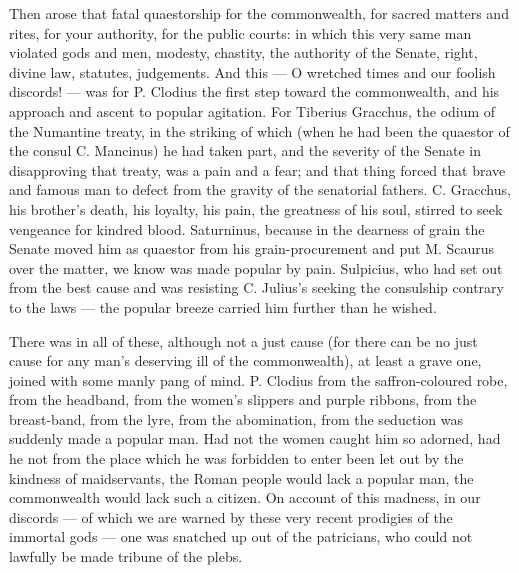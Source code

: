  Then arose that fatal quaestorship for the commonwealth, for sacred matters and rites, for your authority, for the public courts: in which this very same man violated gods and men, modesty, chastity, the authority of the Senate, right, divine law, statutes, judgements. And this --- O wretched times and our foolish discords! --- was for P. Clodius the first step toward the commonwealth, and his approach and ascent to popular agitation. For Tiberius Gracchus, the odium of the Numantine treaty, in the striking of which (when he had been the quaestor of the consul C. Mancinus) he had taken part, and the severity of the Senate in disapproving that treaty, was a pain and a fear; and that thing forced that brave and famous man to defect from the gravity of the senatorial fathers. C. Gracchus, his brother's death, his loyalty, his pain, the greatness of his soul, stirred to seek vengeance for kindred blood. Saturninus, because in the dearness of grain the Senate moved him as quaestor from his grain-procurement and put M. Scaurus over the matter, we know was made popular by pain. Sulpicius, who had set out from the best cause and was resisting C. Julius's seeking the consulship contrary to the laws --- the popular breeze carried him further than he wished.

 There was in all of these, although not a just cause (for there can be no just cause for any man's deserving ill of the commonwealth), at least a grave one, joined with some manly pang of mind. P. Clodius from the saffron-coloured robe, from the headband, from the women's slippers and purple ribbons, from the breast-band, from the lyre, from the abomination, from the seduction was suddenly made a popular man. Had not the women caught him so adorned, had he not from the place which he was forbidden to enter been let out by the kindness of maidservants, the Roman people would lack a popular man, the commonwealth would lack such a citizen. On account of this madness, in our discords --- of which we are warned by these very recent prodigies of the immortal gods --- one was snatched up out of the patricians, who could not lawfully be made tribune of the plebs.

